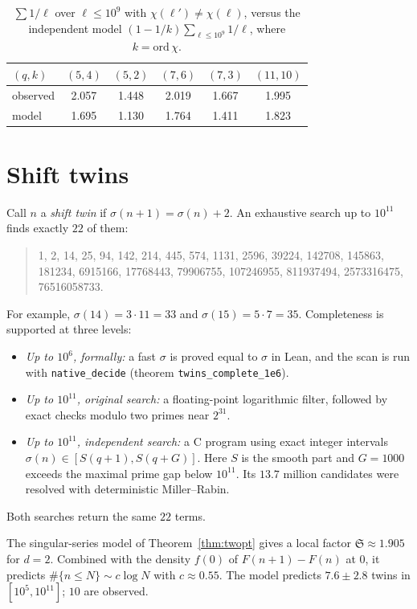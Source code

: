 \documentclass[11pt]{amsart}
\theoremstyle{remark}
\newcommand{\s}{\sigma}
\newcommand{\nx}[1]{#1'}
\begin{document}
\begin{table}[h]
\caption{$\sum 1/\ell$ over $\ell\le10^9$ with $\chi(\nx\ell)\neq\chi(\ell)$, versus the independent model $(1-1/k)\sum_{\ell\le10^9}1/\ell$, where $k=\mathrm{ord}\,\chi$.}\label{tab:H}
\begin{tabular}{lccccc}
\toprule
$(q,k)$ & $(5,4)$ & $(5,2)$ & $(7,6)$ & $(7,3)$ & $(11,10)$\\
\midrule
observed & 2.057 & 1.448 & 2.019 & 1.667 & 1.995\\
model & 1.695 & 1.130 & 1.764 & 1.411 & 1.823\\
\bottomrule
\end{tabular}
\end{table}

\section{Shift twins}

Call $n$ a \emph{shift twin} if $\s(n+1)=\s(n)+2$. An exhaustive search up to $10^{11}$ finds exactly $22$ of them:
\begin{quote}
1, 2, 14, 25, 94, 142, 214, 445, 574, 1131, 2596, 39224, 142708, 145863, 181234, 6915166, 17768443, 79906755, 107246955, 811937494, 2573316475, 76516058733.
\end{quote}
For example, $\s(14)=3\cdot11=33$ and $\s(15)=5\cdot7=35$. Completeness is supported at three levels:
\begin{itemize}
\item \emph{Up to $10^6$, formally:} a fast $\s$ is proved equal to $\s$ in Lean, and the scan is run with \texttt{native\_decide} (theorem \texttt{twins\_complete\_1e6}).
\item \emph{Up to $10^{11}$, original search:} a floating-point logarithmic filter, followed by exact checks modulo two primes near $2^{31}$.
\item \emph{Up to $10^{11}$, independent search:} a C program using exact integer intervals $\s(n)\in[S(q+1),S(q+G)]$. Here $S$ is the smooth part and $G=1000$ exceeds the maximal prime gap below $10^{11}$. Its $13.7$ million candidates were resolved with deterministic Miller--Rabin.
\end{itemize}
Both searches return the same $22$ terms.

The singular-series model of Theorem~\ref{thm:twopt} gives a local factor $\mathfrak S\approx1.905$ for $d=2$. Combined with the density $f(0)$ of $F(n+1)-F(n)$ at $0$, it predicts $\#\{n\le N\}\sim c\log N$ with $c\approx0.55$. The model predicts $7.6\pm2.8$ twins in $[10^5,10^{11}]$; $10$ are observed.
\end{document}
